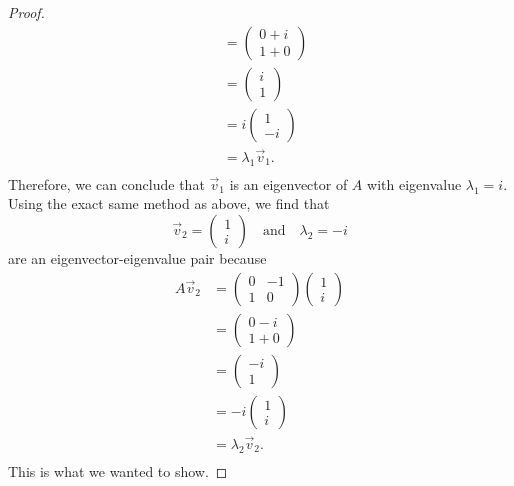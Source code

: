 \documentclass{article}
\begin{document}
\begin{proof}
\begin{align*}
&= \begin{pmatrix}0 + i\\1 + 0\end{pmatrix}\\
& = \begin{pmatrix}i\\1\end{pmatrix}\\
& = i \begin{pmatrix}1\\-i\end{pmatrix}\\ 
& = \lambda_1 \vec{v}_1.\\ 
\end{align*}
Therefore, we can conclude that $\vec{v}_1$ is an eigenvector of $A$ with eigenvalue $\lambda_1 = i$. Using the exact same method as above, we find that $$\vec{v}_2 = \begin{pmatrix}1\\i \end{pmatrix} \quad \text{and} \quad \lambda_2 = -i$$ are an eigenvector-eigenvalue pair because
\begin{align*}
A \vec{v}_2 &= \begin{pmatrix}0&-1\\1&0\end{pmatrix} \begin{pmatrix}1\\i\end{pmatrix}\\
&= \begin{pmatrix}0 - i\\1 + 0\end{pmatrix}\\
&= \begin{pmatrix}-i\\1\end{pmatrix}\\
& = -i \begin{pmatrix}1\\i\end{pmatrix}\\ 
& = \lambda_2 \vec{v}_2.\\ 
\end{align*}
This is what we wanted to show.
\end{proof}
\end{document}
